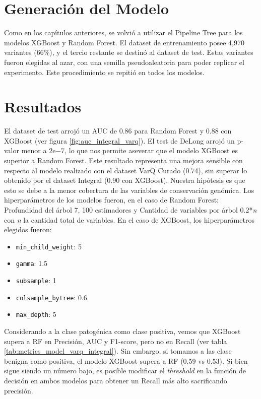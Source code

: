 \section{Generación del Modelo}
Como en los capítulos anteriores, se volvió a utilizar el Pipeline Tree para los modelos XGBoost y Random Forest. El dataset de entrenamiento posee 4,970 variantes (66\%), y el tercio restante se destinó al dataset de test. Estas variantes fueron elegidas al azar, con una semilla pseudoaleatoria para poder replicar el experimento. Este procedimiento se repitió en todos los modelos.  

\section{Resultados}
El dataset de test arrojó un AUC de 0.86 para Random Forest y 0.88 con XGBoost (ver figura \ref{fig:auc_integral_varq}). El test de DeLong \cite{DeLong} arrojó un p-valor menor a $2\mathrm{e}{-7}$, lo que nos permite aseverar que el modelo XGBoost es superior a Random Forest. Este resultado representa una mejora sensible con respecto al modelo realizado con el dataset VarQ Curado (0.74), sin superar lo obtenido por el dataset Integral (0.90 con XGBoost). Nuestra hipótesis es que esto se debe a la menor cobertura de las variables de conservación genómica. Los hiperparámetros de los modelos fueron, en el caso de Random Forest: Profundidad del árbol 7, 100 estimadores y Cantidad de variables por árbol 0.2*\textit{n} con \textit{n} la cantidad total de variables. En el caso de XGBoost, los hiperparámetros elegidos fueron:

\begin{itemize}
    \item \texttt{min\_child\_weight}: 5
    \item \texttt{gamma}: 1.5
    \item \texttt{subsample}: 1
    \item \texttt{colsample\_bytree}: 0.6
    \item \texttt{max\_depth}: 5
\end{itemize}

Considerando a la clase patogénica como clase positiva, vemos que XGBoost supera a RF en Precisión, AUC y F1-score, pero no en Recall (ver tabla \ref{tab:metrics_model_varq_integral}). Sin embargo, si tomamos a las clase benigna como positiva, el modelo XGBoost supera a RF (0.59 vs 0.53). Si bien sigue siendo un número bajo, es posible modificar el \textit{threshold} en la función de decisión en ambos modelos para obtener un Recall más alto sacrificando precisión. 

